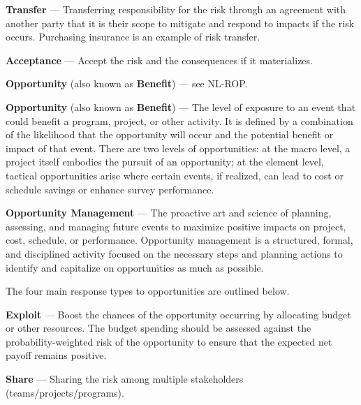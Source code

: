 \textbf{Transfer} ---
Transferring responsibility for the risk through an agreement with another party that it is their scope to mitigate and respond to impacts if the risk occurs. Purchasing insurance is an example of risk transfer.

\textbf{Acceptance} ---
Accept the risk and the consequences if it materializes.

\textbf{Opportunity} (also known as \textbf{Benefit}) --- see NL-ROP.

\textbf{Opportunity} (also known as \textbf{Benefit}) ---
The level of exposure to an event that could benefit a program, project, or other activity. It is defined by a combination of the likelihood that the opportunity will occur and the potential benefit or impact of that event. There are two levels of opportunities: at the macro level, a project itself embodies the pursuit of an opportunity; at the element level, tactical opportunities arise where certain events, if realized, can lead to cost or schedule savings or enhance survey performance.

\textbf{Opportunity Management} ---
The proactive art and science of planning, assessing, and managing future events to maximize positive impacts on project, cost, schedule, or performance. Opportunity management is a structured, formal, and disciplined activity focused on the necessary steps and planning actions to identify and capitalize on opportunities as much as possible.

The four main response types to opportunities are outlined below.

\textbf{Exploit} ---
Boost the chances of the opportunity occurring by allocating budget or other resources. The budget spending should be assessed against the probability-weighted risk of the opportunity to ensure that the expected net payoff remains positive.

\textbf{Share} ---
Sharing the risk among multiple stakeholders (teams/projects/programs).

